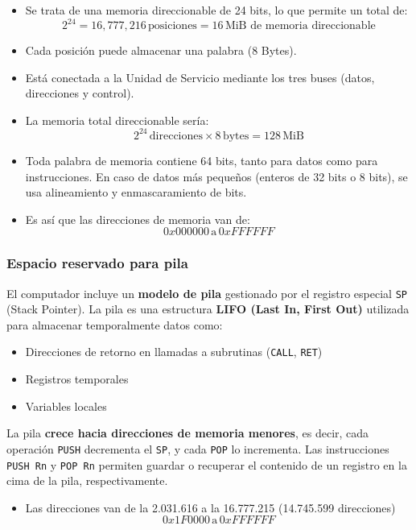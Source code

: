 \documentclass{article}
\begin{document}
\begin{itemize}
    \item Se trata de una memoria direccionable de 24 bits, lo que permite un total de:
    \[
    2^{24} = 16,777,216 \, \text{posiciones} = 16 \, \text{MiB de memoria direccionable}
    \]
    \item Cada posición puede almacenar una palabra (8 Bytes).
    \item Está conectada a la Unidad de Servicio mediante los tres buses (datos, direcciones y control).
    \item La memoria total direccionable sería:
    \[
    2^{24} \, \text{direcciones} \times 8 \, \text{bytes} = 128 \, \text{MiB}
    \]
    \item Toda palabra de memoria contiene 64 bits, tanto para datos como para instrucciones. En caso de datos más pequeños (enteros de 32 bits o 8 bits), se usa alineamiento y enmascaramiento de bits.
    \item Es así que las direcciones de memoria van de:
    \[
    0x000000 \, \text{a} \, 0xFFFFFF
    \]
\end{itemize}

\subsubsection{Espacio reservado para pila}

El computador incluye un \textbf{modelo de pila} gestionado por el registro especial \texttt{SP} (Stack Pointer). La pila es una estructura \textbf{LIFO (Last In, First Out)} utilizada para almacenar temporalmente datos como:

\begin{itemize}
    \item Direcciones de retorno en llamadas a subrutinas (\texttt{CALL}, \texttt{RET})
    \item Registros temporales
    \item Variables locales
\end{itemize}

La pila \textbf{crece hacia direcciones de memoria menores}, es decir, cada operación \texttt{PUSH} decrementa el \texttt{SP}, y cada \texttt{POP} lo incrementa. Las instrucciones \texttt{PUSH Rn} y \texttt{POP Rn} permiten guardar o recuperar el contenido de un registro en la cima de la pila, respectivamente.

\begin{itemize}
    \item Las direcciones van de la 2.031.616 a la 16.777.215 (14.745.599 direcciones)
    \[
    0x1F0000 \, \text{a} \, 0xFFFFFF
    \]
\end{itemize}
\end{document}
